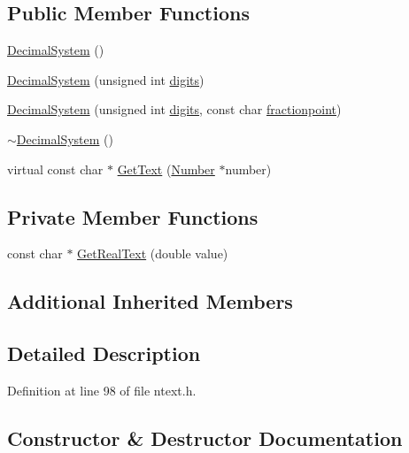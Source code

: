 \subsection*{Public Member Functions}
\begin{DoxyCompactItemize}
\item 
\hyperlink{classDecimalSystem_a96bf562ac5934445ce10dd6d973a9db3}{Decimal\+System} ()
\item 
\hyperlink{classDecimalSystem_a726d1a38079ae571c54adfbd0724a0a3}{Decimal\+System} (unsigned int \hyperlink{classPositionalNumeralSystem_a0a9e8e3f5d46e3c12dd3fc994ed2c1e6}{digits})
\item 
\hyperlink{classDecimalSystem_a0622c834a7a4a0dc452ab4cab8d84902}{Decimal\+System} (unsigned int \hyperlink{classPositionalNumeralSystem_a0a9e8e3f5d46e3c12dd3fc994ed2c1e6}{digits}, const char \hyperlink{classPositionalNumeralSystem_ad986e454b020c21e70f2efbc3682e44f}{fractionpoint})
\item 
\hyperlink{classDecimalSystem_a1a3c3296ae4cd214cd94359982e46dee}{$\sim$\+Decimal\+System} ()
\item 
virtual const char $\ast$ \hyperlink{classDecimalSystem_ab43f764ed35fe831a16a356bbdc72441}{Get\+Text} (\hyperlink{structNumber}{Number} $\ast$number)
\end{DoxyCompactItemize}
\subsection*{Private Member Functions}
\begin{DoxyCompactItemize}
\item 
const char $\ast$ \hyperlink{classDecimalSystem_a7b3744c834e092220ab3c2b7ed8eee47}{Get\+Real\+Text} (double value)
\end{DoxyCompactItemize}
\subsection*{Additional Inherited Members}


\subsection{Detailed Description}


Definition at line 98 of file ntext.\+h.



\subsection{Constructor \& Destructor Documentation}
